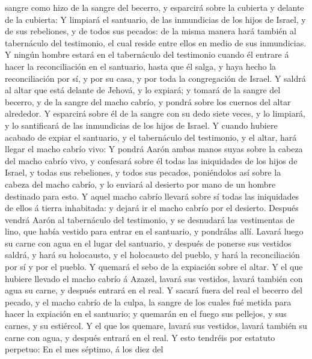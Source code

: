 sangre como hizo de la sangre del becerro, y esparcirá sobre la cubierta
y delante de la cubierta:  Y limpiará el santuario, de
las inmundicias de los hijos de Israel, y de sus rebeliones, y de todos
sus pecados: de la misma manera hará también al tabernáculo del
testimonio, el cual reside entre ellos en medio de sus inmundicias.
 Y ningún hombre estará en el tabernáculo del testimonio
cuando él entrare á hacer la reconciliación en el santuario, hasta que
él salga, y haya hecho la reconciliación por sí, y por su casa, y por
toda la congregación de Israel.  Y saldrá al altar que
está delante de Jehová, y lo expiará; y tomará de la sangre del becerro,
y de la sangre del macho cabrío, y pondrá sobre los cuernos del altar
alrededor.  Y esparcirá sobre él de la sangre con su dedo
siete veces, y lo limpiará, y lo santificará de las inmundicias de los
hijos de Israel.  Y cuando hubiere acabado de expiar el
santuario, y el tabernáculo del testimonio, y el altar, hará llegar el
macho cabrío vivo:  Y pondrá Aarón ambas manos suyas
sobre la cabeza del macho cabrío vivo, y confesará sobre él todas las
iniquidades de los hijos de Israel, y todas sus rebeliones, y todos sus
pecados, poniéndolos así sobre la cabeza del macho cabrío, y lo enviará
al desierto por mano de un hombre destinado para esto.  Y
aquel macho cabrío llevará sobre sí todas las iniquidades de ellos á
tierra inhabitada: y dejará ir el macho cabrío por el desierto.
 Después vendrá Aarón al tabernáculo del testimonio, y se
desnudará las vestimentas de lino, que había vestido para entrar en el
santuario, y pondrálas allí.  Lavará luego su carne con
agua en el lugar del santuario, y después de ponerse sus vestidos
saldrá, y hará su holocausto, y el holocausto del pueblo, y hará la
reconciliación por sí y por el pueblo.  Y quemará el sebo
de la expiación sobre el altar.  Y el que hubiere llevado
el macho cabrío á Azazel, lavará sus vestidos, lavará también con agua
su carne, y después entrará en el real.  Y sacará fuera
del real el becerro del pecado, y el macho cabrío de la culpa, la sangre
de los cuales fué metida para hacer la expiación en el santuario; y
quemarán en el fuego sus pellejos, y sus carnes, y su estiércol.
 Y el que los quemare, lavará sus vestidos, lavará
también su carne con agua, y después entrará en el real. 
Y esto tendréis por estatuto perpetuo: En el mes séptimo, á los diez del

